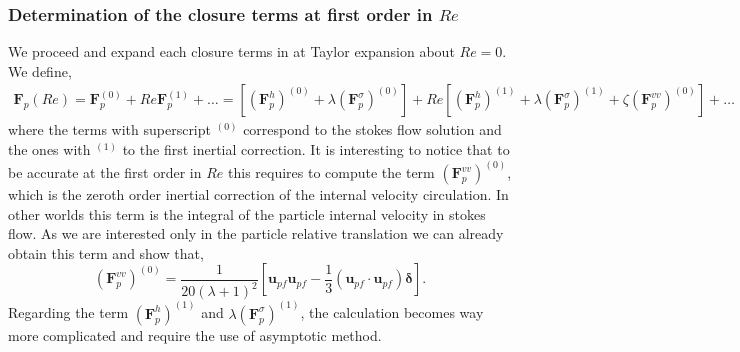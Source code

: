 \subsubsection{Determination of the closure terms at first order in $Re$}

We proceed and expand each closure terms in at Taylor expansion about $Re = 0$. 
We define, 
\begin{align*}
    \textbf{F}_p(Re)
    = 
    \textbf{F}_p^{(0)}
    + Re\textbf{F}_p^{(1)}
    + \ldots 
    = 
    [(\textbf{F}^h_p)^{(0)}+\lambda (\textbf{F}^\sigma_p)^{(0)}]
    + Re[(\textbf{F}^h_p)^{(1)}+\lambda (\textbf{F}^\sigma_p)^{(1)}+\zeta (\textbf{F}^{vv}_p)^{(0)}]
    + \ldots 
\end{align*}
where the terms with  superscript $^{(0)}$ correspond to the stokes flow solution and the ones with $^{(1)}$ to the first inertial correction. 
It is interesting to notice that to be accurate at the first order in $Re$ this requires to compute the term $(\textbf{F}^{vv}_p)^{(0)}$, which is the zeroth order inertial correction of the internal velocity circulation.
In other worlds this term is the integral of the particle internal velocity in stokes flow.  
As we are interested only in the particle relative translation we can already obtain this term and show that, 
\begin{equation*}
    (\textbf{F}^{vv}_p)^{(0)}
    = \frac{1}{20(\lambda +1 )^2}
        [\textbf{u}_{p f}\textbf{u}_{p f} 
    -\frac{1}{3} (\textbf{u}_{p f}\cdot \textbf{u}_{p f})\bm\delta]. 
    \label{eq:closure_vv}
\end{equation*}
Regarding the term $(\textbf{F}^h_p)^{(1)}$ and $\lambda (\textbf{F}^\sigma_p)^{(1)}$, the calculation becomes way more complicated and require the use of asymptotic method. 

